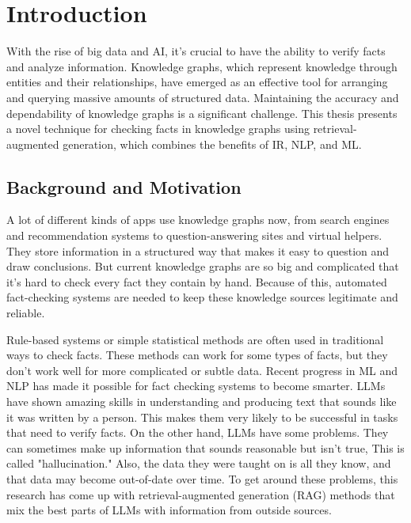 \chapter{Introduction}\label{ch:intro}
With the rise of big data and AI, it's crucial to have the ability to verify facts and analyze information.
Knowledge graphs, which represent knowledge through entities and their relationships, have emerged as an effective tool for arranging and querying massive amounts of structured data.
Maintaining the accuracy and dependability of knowledge graphs is a significant challenge.
This thesis presents a novel technique for checking facts in knowledge graphs using retrieval-augmented generation, which combines the benefits of \ac{IR}, \ac{NLP}, and \ac{ML}.
\section{Background and Motivation}\label{sec:background}
A lot of different kinds of apps use knowledge graphs now, from search engines and recommendation systems to question-answering sites and virtual helpers.
They store information in a structured way that makes it easy to question and draw conclusions.
But current knowledge graphs are so big and complicated that it's hard to check every fact they contain by hand.
Because of this, automated fact-checking systems are needed to keep these knowledge sources legitimate and reliable.

Rule-based systems or simple statistical methods are often used in traditional ways to check facts.
These methods can work for some types of facts, but they don't work well for more complicated or subtle data.
Recent progress in \ac{ML} and \ac{NLP} has made it possible for fact checking systems to become smarter.
\ac{LLMs} have shown amazing skills in understanding and producing text that sounds like it was written by a person.
This makes them very likely to be successful in tasks that need to verify facts.
On the other hand, LLMs have some problems.
They can sometimes make up information that sounds reasonable but isn't true, This is called "hallucination."
Also, the data they were taught on is all they know, and that data may become out-of-date over time.
To get around these problems, this research has come up with retrieval-augmented generation (RAG) methods that mix the best parts of LLMs with information from outside sources.

